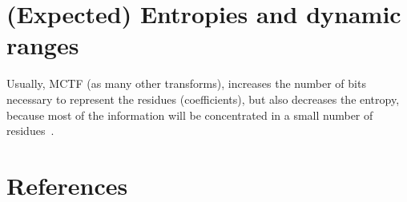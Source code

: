 
\section{(Expected) Entropies and  dynamic ranges}

Usually, MCTF (as many other transforms), increases the number of bits
necessary to represent the residues (coefficients), but also decreases
the entropy, because most of the information will be concentrated in a
small number of residues~\cite{vruiz__MEC}.


\section{References}

\renewcommand{\addcontentsline}[3]{}%


